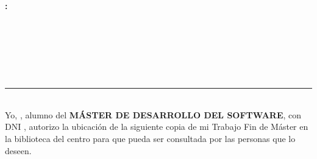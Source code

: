 \chapter*{}


\thispagestyle{empty}

\begin{center}
{\large\bfseries \tituloTFM}\\
\end{center}
\begin{center}
\estudiante\\
\end{center}

\\

\vspace{0.7cm}
\\



\newpage


\thispagestyle{empty}


\begin{center}
{\large\bfseries \titleMT: \subtitleMT}\\
\end{center}
\begin{center}
\estudiante\\
\end{center}

\\

\vspace{0.7cm}
\\



\chapter*{}
\thispagestyle{empty}

\noindent\rule[-1ex]{\textwidth}{2pt}\\[4.5ex]

Yo, \textbf{\estudiante}, alumno del \textbf{MÁSTER DE DESARROLLO DEL SOFTWARE}, con DNI \textbf{\dni}, autorizo la ubicación de la siguiente copia de mi Trabajo Fin de Máster en la biblioteca del centro para que pueda ser consultada por las personas que lo deseen.

